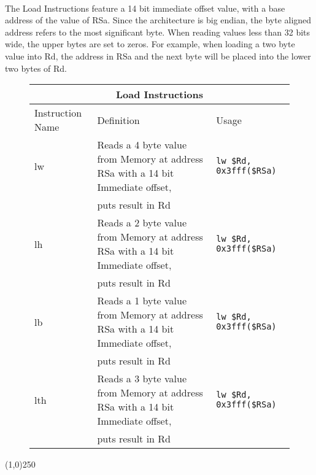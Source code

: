 \documentclass[letterpaper, 11pt]{article}
\begin{document}
\paragraph{} The Load Instructions feature a 14 bit immediate offset value, with a base address of the value of RSa. Since the architecture is big endian,
the byte aligned address refers to the most significant byte. When reading values less than 32 bits wide, the upper bytes are set to zeros. For example, when loading
a two byte value into Rd, the address in RSa and the next byte will be placed into the lower two bytes of Rd.
\begin{figure}[!h]
	\begin{center}
		\begin{tabular}{|l|l|l|}
			\hline
			\multicolumn{3}{c}{Load Instructions} \\ \hline
			Instruction Name	& Definition																		& Usage 							\\ \hline
			lw					& Reads a 4 byte value from Memory at address RSa with a 14 bit Immediate offset,	& \texttt{lw \$Rd, 0x3fff(\$RSa)}	\\ 
			\hfill				& puts result in Rd										\hfill						& \hfill 							\\ \hline
			lh					& Reads a 2 byte value from Memory at address RSa with a 14 bit Immediate offset,	& \texttt{lw \$Rd, 0x3fff(\$RSa)}	\\ 
			\hfill				& puts result in Rd										\hfill						& \hfill 							\\ \hline
			lb					& Reads a 1 byte value from Memory at address RSa with a 14 bit Immediate offset,	& \texttt{lw \$Rd, 0x3fff(\$RSa)}	\\ 
			\hfill				& puts result in Rd										\hfill						& \hfill 							\\ \hline
			lth					& Reads a 3 byte value from Memory at address RSa with a 14 bit Immediate offset,	& \texttt{lw \$Rd, 0x3fff(\$RSa)}	\\ 
			\hfill				& puts result in Rd										\hfill						& \hfill 							\\ \hline
		
		\end{tabular} 
	\end{center}
	
\end{figure}

\begin{center}
	\line(1,0){250}
\end{center}
\end{document}
